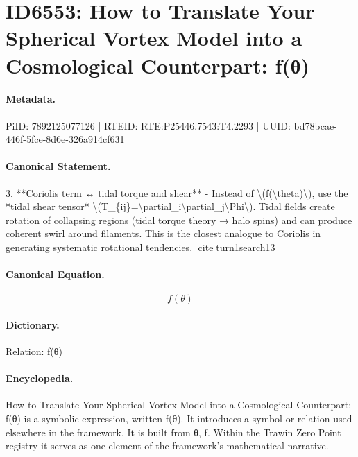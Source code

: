 \section*{ID6553: How to Translate Your Spherical Vortex Model into a Cosmological Counterpart: f(θ)}
\paragraph{Metadata.}
PiID: 7892125077126 | RTEID: RTE:P25446.7543:T4.2293 | UUID: bd78bcae-446f-5fce-8d6e-326a914cf631

\paragraph{Canonical Statement.}
3. **Coriolis term ↔ tidal torque and shear** - Instead of \textbackslash{}(f(\textbackslash{}theta)\textbackslash{}), use the *tidal shear tensor* \textbackslash{}(T\_\{ij\}=\textbackslash{}partial\_i\textbackslash{}partial\_j\textbackslash{}Phi\textbackslash{}). Tidal fields create rotation of collapsing regions (tidal torque theory → halo spins) and can produce coherent swirl around filaments. This is the closest analogue to Coriolis in generating systematic rotational tendencies. citeturn1search13

\paragraph{Canonical Equation.}
\[
f(\theta)
\]

\paragraph{Dictionary.}
Relation: f(θ)

\paragraph{Encyclopedia.}
How to Translate Your Spherical Vortex Model into a Cosmological Counterpart: f(θ) is a symbolic expression, written f(θ). It introduces a symbol or relation used elsewhere in the framework. It is built from θ, f. Within the Trawin Zero Point registry it serves as one element of the framework's mathematical narrative.
